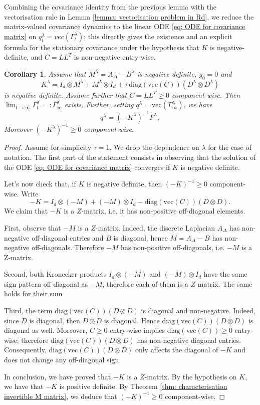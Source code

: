 \documentclass[10pt]{amsart}
\newtheorem{corollary}[theorem]{Corollary}
\numberwithin{equation}{section}
\begin{document}
Combining the covariance identity from the previous lemma with the vectorisation rule in Lemma \ref{lemma: vectorisation problem in Rd}, we reduce the matrix-valued covariance dynamics to the linear ODE \eqref{eq: ODE for covariance matrix} on $q_t^\lambda = vec (\Gamma_t^\lambda )$; this directly gives the existence and an explicit formula for the stationary covariance under the hypothesis that $K$ is negative-definite, and $C = L L^T$ is non-negative entry-wise.
\begin{corollary}
    Assume that $M^\lambda= A_\Delta -B^\lambda$ is negative definite, $y_0 = 0$ and $$
    K^\lambda= I_d \otimes M^\lambda + M ^\lambda\otimes I_d + \tau \, \mathrm{diag} (\mathrm{vec}(C)) (D^\lambda \otimes D^\lambda)
    $$
    is negative definite.  Assume further that $C = L L^T \geq0 $ component-wise. Then $\lim_{t \to \infty } \Gamma_t^\lambda = :\Gamma_\infty^\lambda$ exists. Further, setting $q^\lambda = \mathrm{vec}(\Gamma_\infty^\lambda)$, we have
    $$
     q ^\lambda= (-K^\lambda)^{-1}F^\lambda,
    $$
    Moreover $(-K^\lambda)^{-1} \geq 0$ component-wise.
    \label{cor: non negative  minus inverse K}
\end{corollary}
\begin{proof}
Assume for simplicity $\tau = 1$. We drop the dependence on $\lambda$ for the ease of notation. The first part of the statement consists in observing that the solution of the ODE \eqref{eq: ODE for covariance matrix} converges if $K$ is negative definite.

Let's now check that, if $K$ is negative definite, then $(-K)^{-1} \geq 0$ component-wise. Write
$$
- K = I_d \otimes (-M) + (-M) \otimes I_d - \mathrm{diag} ( \mathrm{vec}(C)) (D \otimes D).
$$
We claim that $-K$ is a $Z$-matrix, i.e. it has non-positive off-diagonal elements.

First, observe that $-M$ is a $Z$-matrix. Indeed, the discrete Laplacian $A_\Delta$ has non-negative off-diagonal entries and $B $ is diagonal, hence $M = A_\Delta - B$ has non-negative off-diagonals. Therefore $-M$ has non-positive off-diagonals, i.e. $-M$ is a Z-matrix. 

Second, both Kronecker products $I_d \otimes  (-M)$ and $(-M) \otimes  I_d$ have the same sign pattern off-diagonal as $-M$, therefore each of them is a $Z$-matrix. The same holds for their sum

Third, the term $\mathrm{diag} (\mathrm{vec}(C)) ( D \otimes D)$ is diagonal and non-negative. Indeed, since $D$ is diagonal, then $D \otimes D$ is diagonal. Hence $\mathrm{diag} (\mathrm{vec} (C)) ( D \otimes D)$ is diagonal as well. Moreover, $C \geq 0$ entry-wise implies $\mathrm{diag} (\mathrm{vec} (C)) \geq 0$ entry-wise; therefore  $ \mathrm{diag} (\mathrm{vec}(C)) (D \otimes D)$ has non-negative diagonal entries. Consequently,
$\mathrm{diag}(\mathrm{vec}(C))(D\otimes D)$ only affects the diagonal of $-K$ and does not change any
off-diagonal sign.

In conclusion, we have proved that $-K$ is a $Z$-matrix. By the hypothesis on $K$, we have that $-K$ is positive definite. By Theorem \ref{thm: characterisation invertible M matrix}, we deduce that $(-K)^{-1} \geq 0$ component-wise.


\end{proof}
\end{document}
